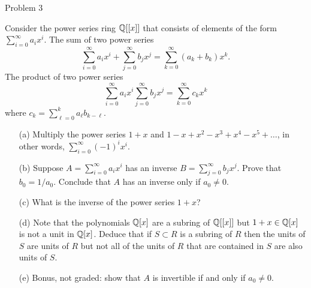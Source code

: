\documentclass{hmwk}
\begin{document}
\begin{problem}{Problem 3}

\pre Consider the power series ring $\mathbb{Q}[[x]]$ that consists of elements of the form $\sum_{i = 0}^\infty a_i x^i$. 
The sum of two power series 
$$\sum_{i = 0}^\infty a_i x^i+ \sum_{j = 0}^\infty b_j x^j = \sum_{k = 0}^\infty (a_k +b_k) x^k.$$
The product of two power series $$\sum_{i = 0}^\infty a_i x^i \sum_{j = 0}^\infty b_j x^j = \sum_{k = 0}^\infty c_k x^k$$ where $c_k = \sum_{\ell = 0}^k a_\ell b_{k- \ell}$.

\begin{itemize}
	\item[(a)] Multiply the power series $1+x$ and $1 - x + x^2 - x^3 + x^4 - x^5 + \dots$, in other words, $\sum_{i = 0}^\infty (-1)^i x^i$.
	\item[(b)] Suppose $A = \sum_{i = 0}^\infty a_i x^i$ has an inverse $B = \sum_{j = 0}^\infty b_j x^j$. Prove that $b_0 = 1/a_0$. Conclude that $A$ has an inverse only if $a_0 \neq 0$.
	\item[(c)] What is the inverse of the power series $1+x$? 
	\item[(d)] Note that the polynomials $\mathbb{Q}[x]$ are a subring of $\mathbb{Q}[[x]]$ but $1+x \in \mathbb{Q}[x]$ is not a unit in $\mathbb{Q}[x]$. Deduce that if $S \subset R$ is a subring of $R$ then the units of $S$ are units of $R$ but not all of the units of $R$ that are contained in $S$ are also units of $S$.
	\item[(e)] Bonus, not graded: show that $A$ is invertible if and only if $a_0 \neq 0$.
\end{itemize}
\end{problem}
\end{document}

